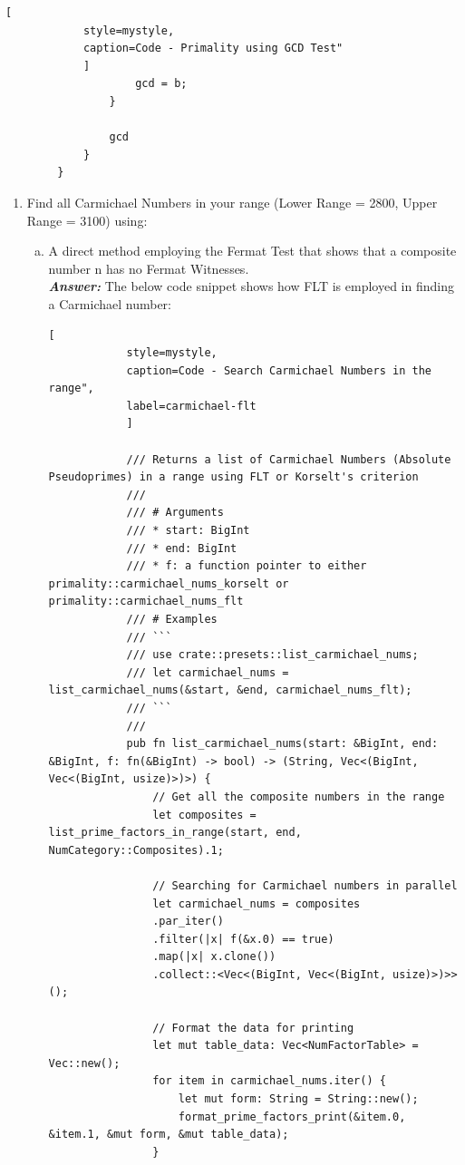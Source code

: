 \documentclass[11pt,a4paper]{article}
\begin{document}
\begin{enumerate}[1.]
\begin{flushleft}
\begin{lstlisting}[
			style=mystyle, 
			caption=Code - Primality using GCD Test"  
			]
					gcd = b;
				}
				
				gcd
			}
		}
		\end{lstlisting}
		
		\end{flushleft}
		\bigskip
	
	\begin{enumerate}[2.]
		\item Find all Carmichael Numbers in your range (Lower Range = 2800, Upper Range = 3100) using:

	
	\begin{flushleft}
		\medskip
		\begin{enumerate}[(a)]
			\item A direct method employing the Fermat Test that shows that a composite number n has no Fermat Witnesses. \\
			\medskip
			\textbf{\textit{Answer:}} The below code snippet shows how FLT is employed in finding a Carmichael number:
		
			\begin{lstlisting}[
			style=mystyle,
			caption=Code - Search Carmichael Numbers in the range",
			label=carmichael-flt  
			]
			
			/// Returns a list of Carmichael Numbers (Absolute Pseudoprimes) in a range using FLT or Korselt's criterion
			///
			/// # Arguments
			/// * start: BigInt
			/// * end: BigInt
			/// * f: a function pointer to either primality::carmichael_nums_korselt or primality::carmichael_nums_flt
			/// # Examples
			/// ```
			/// use crate::presets::list_carmichael_nums;
			/// let carmichael_nums = list_carmichael_nums(&start, &end, carmichael_nums_flt);
			/// ```
			///
			pub fn list_carmichael_nums(start: &BigInt, end: &BigInt, f: fn(&BigInt) -> bool) -> (String, Vec<(BigInt, Vec<(BigInt, usize)>)>) {
				// Get all the composite numbers in the range
				let composites = list_prime_factors_in_range(start, end, NumCategory::Composites).1;
				
				// Searching for Carmichael numbers in parallel
				let carmichael_nums = composites
				.par_iter()
				.filter(|x| f(&x.0) == true)
				.map(|x| x.clone())
				.collect::<Vec<(BigInt, Vec<(BigInt, usize)>)>>();
				
				// Format the data for printing
				let mut table_data: Vec<NumFactorTable> = Vec::new();
				for item in carmichael_nums.iter() {
					let mut form: String = String::new();
					format_prime_factors_print(&item.0, &item.1, &mut form, &mut table_data);
				}
				

\end{lstlisting}
\end{enumerate}
\end{flushleft}
\end{enumerate}
\end{enumerate}
\end{document}
